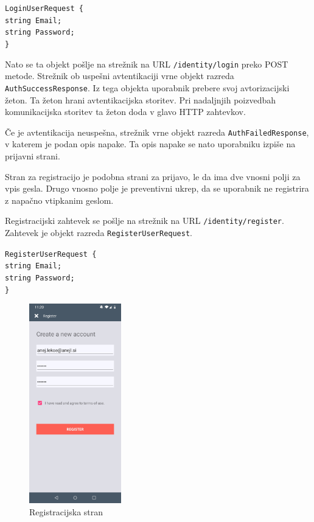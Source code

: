\documentclass[a4paper, 12pt]{book}
\begin{document}
\noindent \texttt{LoginUserRequest \{ \\
	string Email; \\
	string Password; \\
\} }

Nato se ta objekt pošlje na strežnik na URL \texttt{/identity/login} preko POST metode.
Strežnik ob uspešni avtentikaciji vrne objekt razreda \texttt{AuthSuccessResponse}.
Iz tega objekta uporabnik prebere svoj avtorizacijski žeton.
Ta žeton hrani avtentikacijska storitev.
Pri nadaljnjih poizvedbah komunikacijska storitev ta žeton doda v glavo HTTP zahtevkov.

Če je avtentikacija neuspešna, strežnik vrne objekt razreda \texttt{AuthFailedResponse}, v katerem je podan opis napake.
Ta opis napake se nato uporabniku izpiše na prijavni strani.

Stran za registracijo je podobna strani za prijavo, le da ima dve vnosni polji za vpis gesla.
Drugo vnosno polje je preventivni ukrep, da se uporabnik ne registrira z napačno vtipkanim geslom.

Registracijski zahtevek se pošlje na strežnik na URL \texttt{/identity/register}.
Zahtevek je objekt razreda \texttt{RegisterUserRequest}.

\noindent \texttt{RegisterUserRequest \{ \\
	string Email; \\
	string Password; \\
\} }

\begin{figure}[H]
\begin{center}
\includegraphics[width=4cm]{app_register}
\end{center}
	\caption{Registracijska stran}
\label{app_register}
\end{figure}
\end{document}
